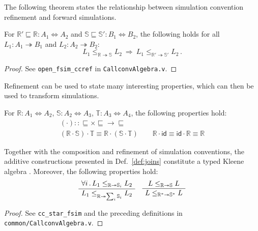 \documentclass[acmsmall,authordraft]{acmart}
\newcommand{\kw}[1]{\ensuremath{ \mathsf{#1} }}
\newcommand{\scref}{\sqsubseteq}
\begin{document}
The following theorem states the relationship between
simulation convention refinement and forward simulations.

\begin{theorem} %
For
$\mathbb{R}' \scref \mathbb{R} : A_1 \Leftrightarrow A_2$ and
$\mathbb{S} \scref \mathbb{S}' : B_1 \Leftrightarrow B_2$,
the following holds for all
$L_1 : A_1 \twoheadrightarrow B_1$ and $L_2 : A_2 \twoheadrightarrow B_2$:
\[
      L_1 \le_{\mathbb{R} \twoheadrightarrow \mathbb{S}} L_2
      \: \Rightarrow \:
      L_1 \le_{\mathbb{R}' \twoheadrightarrow \mathbb{S}'} L_2 \,.
\]
\begin{proof}
See \texttt{open\_fsim\_ccref} in \texttt{CallconvAlgebra.v}.
\end{proof}
\end{theorem}

Refinement can be used to state many interesting properties,
which can then be used to transform simulations.

\begin{theorem} %
For
$\mathbb{R} : A_1 \Leftrightarrow A_2$,
$\mathbb{S} : A_2 \Leftrightarrow A_3$,
$\mathbb{T} : A_3 \Leftrightarrow A_4$,
the following properties hold:
\begin{gather*}
  ({\cdot}) :: {{\scref} \times {\scref} \rightarrow {\scref}}
  \\
  (\mathbb{R} \cdot \mathbb{S}) \cdot \mathbb{T} \equiv
    \mathbb{R} \cdot (\mathbb{S} \cdot \mathbb{T})
  \qquad
  \mathbb{R} \cdot \kw{id} \equiv
  \kw{id} \cdot \mathbb{R} \equiv
  \mathbb{R}
\end{gather*}
\end{theorem}

\begin{theorem} \label{thm:simk} %
Together with the composition and refinement of simulation conventions,
the additive constructions presented in Def.~\ref{def:joins}
constitute a typed Kleene algebra \cite{tka}.
Moreover, the following properties hold:
\[
  \AxiomC{$\forall i \,.\,
    L_1 \le_{\mathbb{R} \twoheadrightarrow \mathbb{S}_i} L_2$}
  \UnaryInfC{$
    L_1 \le_{\mathbb{R} \twoheadrightarrow \sum_i \mathbb{S}_i} L_2$}
  \DisplayProof
  \quad
  \AxiomC{$L \le_{\mathbb{R} \twoheadrightarrow \mathbb{S}} L$}
  \UnaryInfC{$L \le_{\mathbb{R}^* \twoheadrightarrow \mathbb{S}^*} L$}
  \DisplayProof
\]
\begin{proof}
See \texttt{cc\_star\_fsim} and the preceding definitions
in \texttt{common/CallconvAlgebra.v}.
\end{proof}
\end{theorem}
\end{document}
